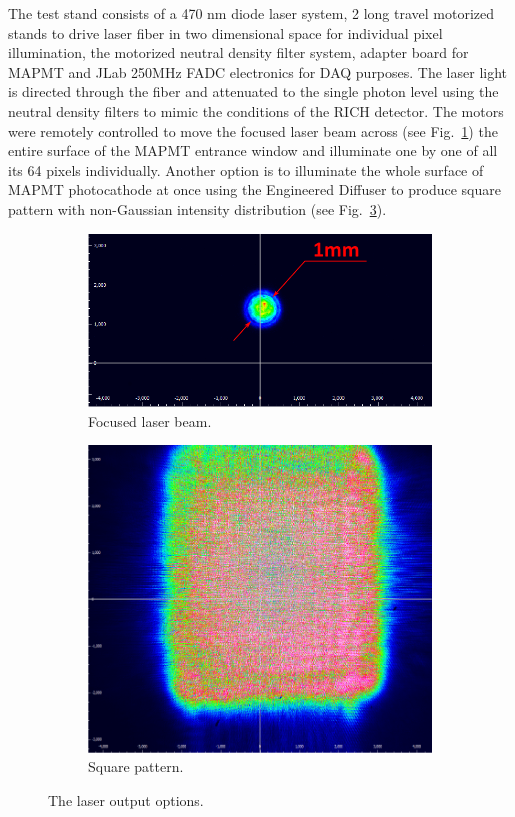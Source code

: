 \documentclass[5p,times,preprint]{elsarticle}
\begin{document}
The test stand consists of a 470 nm diode laser system, 2 long travel motorized stands to drive laser fiber in two dimensional space for individual pixel illumination, the motorized neutral density filter system, adapter board for MAPMT and JLab 250MHz FADC electronics for DAQ purposes.
The laser light is directed through the fiber and attenuated to the single photon level using the neutral density filters to mimic the conditions of the RICH detector.
The motors were remotely controlled to move the focused laser beam across (see Fig.~\ref{fig:beamopt1}) the entire surface of the MAPMT entrance window and illuminate one by one of all its 64 pixels individually.
Another option is to illuminate the whole surface of MAPMT photocathode at once using the Engineered Diffuser to produce square pattern with non-Gaussian intensity distribution (see Fig.~\ref{fig:beamopt2}).

\begin{figure}[bt]
	\centering
	\begin{subfigure}[b]{0.628\linewidth}
		\includegraphics[width=\textwidth]{beamspot.pdf}
		\caption{Focused laser beam.}
		\label{fig:beamopt1}
	\end{subfigure}
	\begin{subfigure}[b]{0.354\linewidth}
		\includegraphics[width=\textwidth]{beamsquare.pdf}
		\caption{Square pattern.}
		\label{fig:beamopt2}
	\end{subfigure}
	\caption{The laser output options.}
\end{figure}
\end{document}
